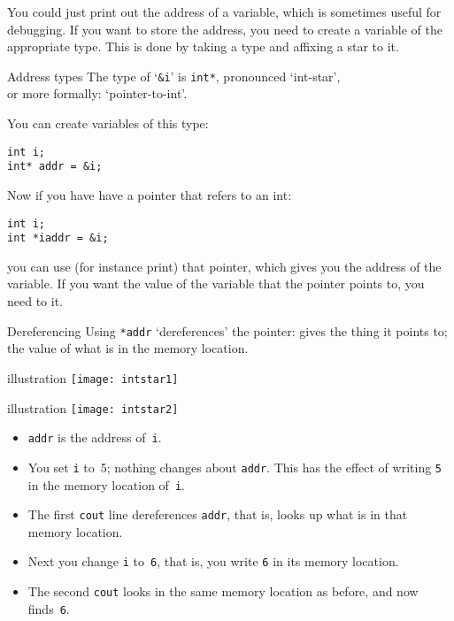 You could just print out the address of a variable, which is sometimes
useful for debugging. If you want to store the address, you need to
create a variable of the appropriate type. This is done by taking a
type and affixing a star to it.

\begin{block}{Address types}
  \label{sl:intstar}
  The type of `\lstinline{&i}' is \lstinline{int*}, pronounced `int-star',\\
  or more
  formally: `pointer-to-int'.

  You can create variables of this type:
\begin{lstlisting}
int i;
int* addr = &i;
\end{lstlisting}
\end{block}

Now if you have have a pointer that refers to an int:
\begin{lstlisting}
int i;
int *iaddr = &i;
\end{lstlisting}
you can use (for instance print) that pointer, which gives you the
address of the variable. If you want the value of the variable that
the pointer points to, you need to  it.

\begin{block}{Dereferencing}
  \label{sl:starderef}
  Using \lstinline{*addr} `dereferences' the pointer: gives the thing it
  points to;\\
  the value of what
  is in the memory location.
\end{block}

\begin{block}{illustration}
  \label{sl:copy-pic}
  \texttt{[image: intstar1]}
\end{block}

\begin{block}{illustration}
  \label{sl:deref-pic}
  \texttt{[image: intstar2]}
\end{block}

\begin{itemize}
\item \lstinline{addr} is the address of~\lstinline{i}.
\item You set \lstinline{i} to~5; nothing changes about \lstinline{addr}. This has the
  effect of writing \lstinline{5} in the memory location of~\lstinline{i}.
\item The first \lstinline{cout} line dereferences \lstinline{addr}, that is, looks up
  what is in that memory location.
\item Next you change \lstinline{i} to~\lstinline{6}, that is, you write \lstinline{6} in its
  memory location.
\item The second \lstinline{cout} looks in the same memory location as before,
  and now finds~\lstinline{6}.
\end{itemize}

